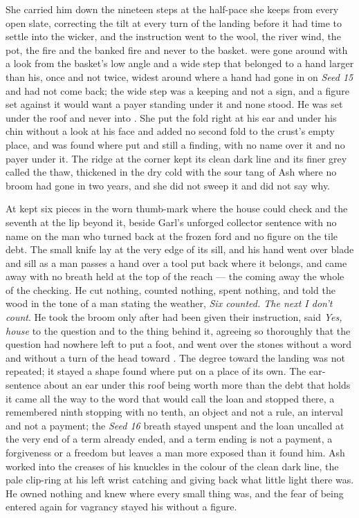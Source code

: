 She carried him down the nineteen steps at the half-pace she keeps from every open slate, correcting the tilt at every turn of the landing before it had time to settle into the wicker, and the instruction went to the wool, the river wind, the pot, the fire and the banked fire and never to the basket.  were gone around with a look from the basket's low angle and a wide step that belonged to a hand larger than his, once and not twice, widest around  where a hand had gone in on \emph{Seed 15} and had not come back; the wide step was a keeping and not a sign, and a figure set against it would want a payer standing under it and none stood. He was set under the roof and never into . She put the fold right at his ear and under his chin without a look at his face and added no second fold to the crust's empty place, and  was found where put and still a finding, with no name over it and no payer under it. The ridge at the corner kept its clean dark line and its finer grey called the thaw, thickened in the dry cold with the sour tang of Ash where no broom had gone in two years, and she did not sweep it and did not say why.

At   kept six pieces in the worn thumb-mark where the house could check and the seventh at the lip beyond it, beside Garl's unforged collector sentence with no name on the man who turned back at the frozen ford and no figure on the tile debt. The small knife lay at the very edge of its sill, and his hand went over blade and sill as a man passes a hand over a tool put back where it belongs, and came away with no breath held at the top of the reach --- the coming away the whole of the checking. He cut nothing, counted nothing, spent nothing, and told the wood in the tone of a man stating the weather, \emph{Six counted. The next I don't count}. He took the broom only after  had been given their instruction, said \emph{Yes, house} to the question and to the thing behind it, agreeing so thoroughly that the question had nowhere left to put a foot, and went over the stones without a word and without a turn of the head toward . The degree toward the landing was not repeated; it stayed a shape found where put on a place of its own. The ear-sentence about an ear under this roof being worth more than the debt that holds it came all the way to the word that would call the loan and stopped there, a remembered ninth stopping with no tenth, an object and not a rule, an interval and not a payment; the \emph{Seed 16} breath stayed unspent and the loan uncalled at the very end of a term already ended, and a term ending is not a payment, a forgiveness or a freedom but leaves a man more exposed than it found him. Ash worked into the creases of his knuckles in the colour of the clean dark line, the pale clip-ring at his left wrist catching and giving back what little light there was. He owned nothing and knew where every small thing was, and the fear of being entered again for vagrancy stayed his without a figure.

